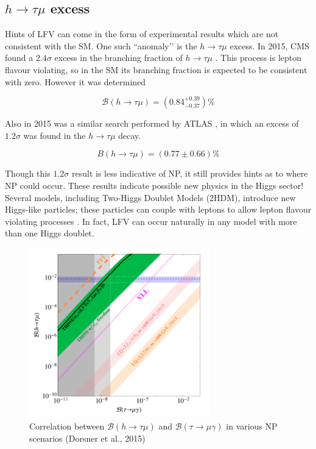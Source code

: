 \documentclass[12pt]{thesis}  %
\newcommand{\br}{\mathcal{B}}
\newcommand{\tmg}{\tau\to\mu\gamma}
\newcommand{\htm}{h\to \tau \mu}
\begin{document}
\subsection{$\htm$ excess}

Hints of LFV can come in the form of experimental results which are not consistent with the SM. One such ``anomaly’’ is the $\htm$ excess. In 2015, CMS found a $2.4\sigma$ excess in the branching fraction of $\htm$ \cite{CMS:2015a}. This process is lepton flavour violating, so in the SM its branching fraction is expected to be consistent with zero. However it was determined

\begin{equation}
\br(h\to \tau \mu) = (0.84^{+0.39}_{-0.37})\%
\end{equation}

Also in 2015 was a similar search performed by ATLAS \cite{ATLAS:2015}, in which an excess of $1.2\sigma$ was found in the $\htm$ decay. 

\begin{equation}
B(\htm) = (0.77 \pm 0.66)\%
\end{equation}

Though this $1.2\sigma$ result is less indicative of NP, it still provides hints as to where NP could occur. These results indicate possible new physics in the Higgs sector! Several models, including Two-Higgs Doublet Models (2HDM), introduce new Higgs-like particles; these particles can couple with leptons to allow lepton flavour violating processes \cite{Harnik:2012}. In fact, LFV can occur naturally in any model with more than one Higgs doublet.

\begin{figure}[h]
\centering
\includegraphics[width=0.7\textwidth]{images/h-vs-tau.png}
\caption{Correlation between $\br(\htm)$ and $\br(\tmg)$ in various NP scenarios (Dorsner et al., 2015)}
\label{}
\end{figure}
\end{document}
